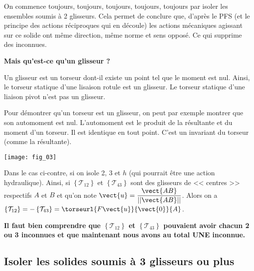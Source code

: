 On commence toujours, \large{toujours}, \Large{toujours}, \LARGE{toujours}, \huge{toujours} \normalsize par isoler les ensembles soumis à 2 glisseurs. Cela permet de conclure que, d'après le PFS (et le principe des actions réciproques qui en découle) les actions mécaniques agissant sur ce solide ont même direction, même norme et sens opposé. Ce qui supprime des inconnues.

\textbf{Mais qu'est-ce qu'un glisseur ?}

Un glisseur est un torseur dont-il existe un point tel que le moment est nul. Ainsi, le torseur statique d'une lisaison rotule est un glisseur. Le torseur statique d'une liaison pivot n'est pas un glisseur. 



\begin{remarque}
Pour démontrer qu'un torseur est un glisseur, on peut par exemple montrer que son automoment est nul. L'automoment est le produit de la résultante et du moment d'un torseur. Il est identique en tout point. C'est un invariant du torseur (comme la résultante).
\end{remarque}

\begin{marginfigure}
\texttt{[image: fig\_03]}
\end{marginfigure}

Dans le cas ci-contre, si on isole 2, 3 et $h$ (qui pourrait être une action hydraulique). Ainsi, si $\left\{\mathcal{T}_{12}\right\}$ et $\left\{\mathcal{T}_{43}\right\}$ sont des glisseurs de << centres >> respectifs $A$ et $B$ et qu'on note $\vect{u}=\dfrac{\vect{AB}}{||\vect{AB}||}$. Alors on a $\left\{\mathcal{T}_{12}\right\}=-\left\{\mathcal{T}_{43}\right\}=\torseurl{F\vect{u}}{\vect{0}}{A}$. 

\textbf{Il faut bien comprendre que $\left\{\mathcal{T}_{12}\right\}$ et $\left\{\mathcal{T}_{43}\right\}$  pouvaient avoir chacun 2 ou 3 inconnues et que maintenant nous avons au total UNE inconnue.}


\subsection{Isoler les solides soumis à 3 glisseurs ou plus}

